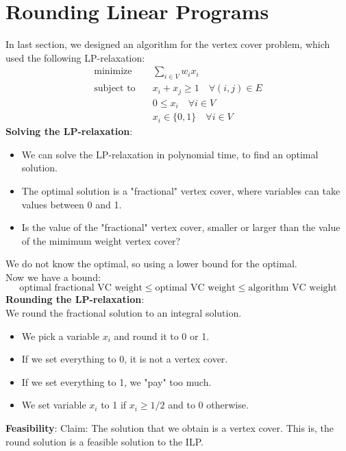 \documentclass[onecolumn]{report}
\begin{document}
\section{Rounding Linear Programs}
In last section, we designed an algorithm for the vertex cover problem, which used the following LP-relaxation:
\begin{equation*}
    \begin{aligned}
    \text{minimize} \quad & \sum_{i \in V} w_i x_i\\
    \text{subject to} \quad & x_i + x_j \geq 1 \quad \forall (i,j) \in E\\
    & 0 \leq x_i \quad \forall i \in V\\
    & x_i \in \{0,1\} \quad \forall i \in V
    \end{aligned}
\end{equation*}
\textbf{Solving the LP-relaxation}:\\
\begin{itemize}
    \item We can solve the LP-relaxation in polynomial time, to find an optimal solution.
    \item The optimal solution is a "fractional" vertex cover, where variables can take values between 0 and 1.
    \item Is the value of the "fractional" vertex cover, smaller or larger than the value of the mimimum weight vertex cover?
\end{itemize}
We do not know the optimal, so using a lower bound for the optimal.\\
Now we have a bound:
\begin{equation*}
    \text{optimal fractional VC weight} \leq \text{optimal VC weight} \leq \text{algorithm VC weight}
\end{equation*}
\textbf{Rounding the LP-relaxation}:\\
We round the fractional solution to an integral solution.
\begin{itemize}
    \item We pick a variable $x_i$ and round it to 0 or 1.
    \item If we set everything to 0, it is not a vertex cover.
    \item If we set everything to 1, we "pay" too much.
    \item We set variable $x_i$ to 1 if $x_i \geq 1/2$ and to 0 otherwise.
\end{itemize}
\textbf{Feasibility}:
Claim: The solution that we obtain is a vertex cover. This is, the round solution is a feasible solution to the ILP.
\end{document}
